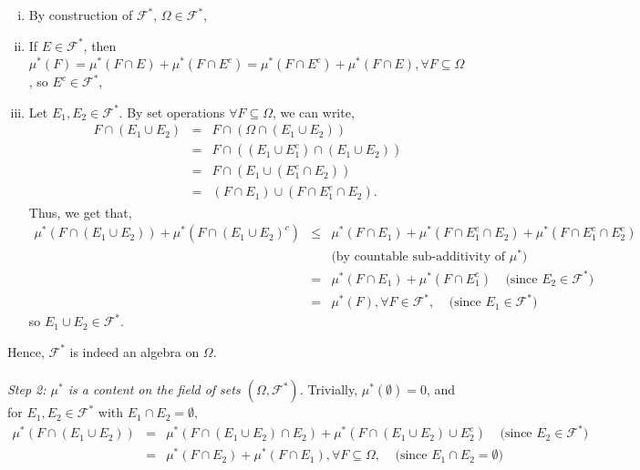 \documentclass{article}
\begin{document}
\begin{enumerate}[(i)]
	\item By construction of $\mathcal{F}^{*}$, $\Omega \in \mathcal{F}^{*}$,
	\item If $E \in \mathcal{F}^{*}$, then  $\mu^{*}(F) = \mu^{*}(F \cap E) + \mu^{*}(F \cap E^c) = \mu^{*}(F \cap E^c) + \mu^{*}(F \cap E), \forall F \subseteq \Omega$, so $E^c \in \mathcal{F}^{*}$,
	\item Let $E_1, E_2 \in \mathcal{F}^{*}$. By set operations $\forall F \subseteq \Omega$, we can write,
	\begin{eqnarray}
	\nonumber
	F \cap (E_1 \cup E_2) &=& F \cap (\Omega \cap (E_1 \cup E_2))\\
	\nonumber
	&=& F \cap ((E_1 \cup E_1^c) \cap (E_1 \cup E_2))\\
	\nonumber
	&=& F \cap (E_1 \cup (E_1^c \cap E_2))\\
	\nonumber
	&=& (F \cap E_1) \cup (F \cap E_1^c \cap E_2).
	\end{eqnarray}
	Thus, we get that,
	\begin{eqnarray}
	\nonumber
	\mu^{*}(F \cap (E_1 \cup E_2)) + \mu^{*}(F \cap (E_1 \cup E_2)^c) &\leq& \mu^{*}(F \cap E_1) + \mu^{*}(F \cap E_1^c \cap E_2) + \mu^{*}(F \cap E_1^c \cap E_2^c)\\
	\nonumber
	&{}& \text{(by countable sub-additivity of $\mu^{*}$)}\\
	\nonumber
	&=& \mu^{*}(F \cap E_1) + \mu^{*}(F \cap E_1^c) \ \ \ \ \ \text{(since $E_2 \in \mathcal{F}^{*}$)}\\
	\nonumber
	&=& \mu^{*}(F), \forall F \in \mathcal{F}^{*}, \ \ \ \ \ \text{(since $E_1 \in \mathcal{F}^{*}$)}
	\end{eqnarray}
	so $E_1 \cup E_2 \in \mathcal{F}^{*}$.
\end{enumerate}
Hence, $\mathcal{F}^{*}$ is indeed an algebra on $\Omega$.\\\\
\textit{Step 2: $\mu^{*}$ is a content on the field of sets $(\Omega, \mathcal{F}^{*})$.} Trivially, $\mu^{*}(\emptyset) = 0$, and for $E_1, E_2 \in \mathcal{F}^{*}$ with $E_1 \cap E_2 = \emptyset$,
\begin{eqnarray}
\nonumber
\mu^{*}(F \cap (E_1 \cup E_2)) &=& \mu^{*}(F \cap (E_1 \cup E_2) \cap E_2) + \mu^{*}(F \cap (E_1 \cup E_2) \cup E_2^c) \ \ \ \ \ \text{(since $E_2 \in \mathcal{F}^{*}$)}\\
\nonumber
&=& \mu^{*}(F \cap E_2) + \mu^{*}(F \cap E_1), \forall F \subseteq \Omega, \ \ \ \ \ \text{(since $E_1 \cap E_2 = \emptyset$)}
\end{eqnarray}
\end{document}
